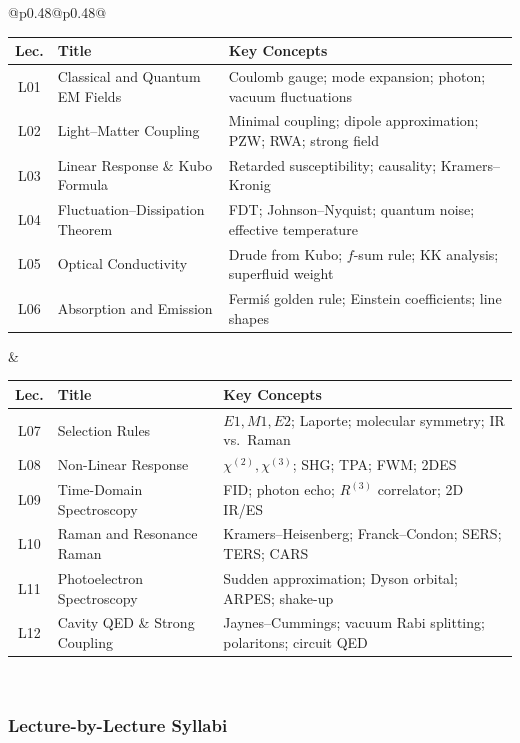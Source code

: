 \documentclass[11pt,a4paper]{article}
\begin{document}
\begin{center}
\begin{tabular}{@{}p{}@{\textwidth}p{}@{}}
\begin{tabular}[t]{@{}clp{4.5cm}@{}}
\toprule
\textbf{Lec.} & \textbf{Title} & \textbf{Key Concepts}\\
\midrule
L01 & Classical and Quantum EM Fields & Coulomb gauge; mode expansion; photon; vacuum fluctuations\\
L02 & Light--Matter Coupling & Minimal coupling; dipole approximation; PZW; RWA; strong field\\
L03 & Linear Response \& Kubo Formula & Retarded susceptibility; causality; Kramers--Kronig\\
L04 & Fluctuation--Dissipation Theorem & FDT; Johnson--Nyquist; quantum noise; effective temperature\\
L05 & Optical Conductivity & Drude from Kubo; $f$-sum rule; KK analysis; superfluid weight\\
L06 & Absorption and Emission & Fermi\'s golden rule; Einstein coefficients; line shapes\\
\bottomrule
\end{tabular}
&
\begin{tabular}[t]{@{}clp{4.5cm}@{}}
\toprule
\textbf{Lec.} & \textbf{Title} & \textbf{Key Concepts}\\
\midrule
L07 & Selection Rules & $E1,M1,E2$; Laporte; molecular symmetry; IR vs.\ Raman\\
L08 & Non-Linear Response & $\chi^{(2)},\chi^{(3)}$; SHG; TPA; FWM; 2DES\\
L09 & Time-Domain Spectroscopy & FID; photon echo; $R^{(3)}$ correlator; 2D IR/ES\\
L10 & Raman and Resonance Raman & Kramers--Heisenberg; Franck--Condon; SERS; TERS; CARS\\
L11 & Photoelectron Spectroscopy & Sudden approximation; Dyson orbital; ARPES; shake-up\\
L12 & Cavity QED \& Strong Coupling & Jaynes--Cummings; vacuum Rabi splitting; polaritons; circuit QED\\
\bottomrule
\end{tabular}
\\
\end{tabular}
\end{center}

\subsubsection*{Lecture-by-Lecture Syllabi}
\end{document}
